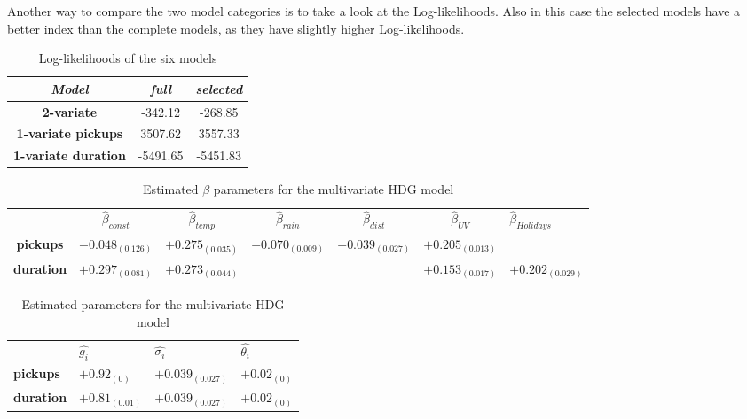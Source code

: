 Another way to compare the two model categories is to take a look at the Log-likelihoods. Also in this case the selected models have a better index than the complete models, as they have slightly higher Log-likelihoods.
\begin{table}[h!]
	\centering
	\begin{tabular}{c|c|c}
		\hline
		\textit{Model} &\textit{full } & \textit{selected} \\ 
		\hline
		\textbf{2-variate } & -342.12  & -268.85    \\ 
		\hline
		\textbf{1-variate pickups } & 3507.62  & 3557.33    \\ 
		\hline
		\textbf{1-variate duration} & -5491.65  & -5451.83   \\ 
		\hline
	\end{tabular}
	\caption{Log-likelihoods of the six models}
	\label{Log-likelihoods HDGM}
\end{table}

\begin{table}[h!]
	\centering
	\begin{tabular}{|ccccccl}
		\hline
		& $\hat{\beta}_{const}$  & $\hat{\beta}_{temp}$ & $\hat{\beta}_{rain}$ & $\hat{\beta}_{dist}$ & $\hat{\beta}_{UV}$ &$\hat{\beta}_{Holidays}$      \\ \cline{2-7} 
		\multicolumn{1}{|c|}{\textbf{pickups}}  & $-0.048_{(0.126)}$ & $+0.275_{(0.035)}$ & $-0.070_{(0.009)}$ & $+0.039_{(0.027)}$ & $+0.205_{(0.013)}$ &              \\
		\multicolumn{1}{|c|}{\textbf{duration}} & $+0.297_{(0.081)}$  & $+0.273_{(0.044)}$ &               &               & $+0.153_{(0.017)}$  & $+0.202_{(0.029)}$
	\end{tabular}
\caption{Estimated $\beta$ parameters for the multivariate HDG model}
\label{Bivariate Beta HDGM}
\end{table}

\begin{table}[]
	\begin{tabular}{|llll}
		\hline
		& $\hat{g_i}$  & $\hat{\sigma_i}$ & $\hat{\theta_i}$  \\ \cline{2-4} 
		\multicolumn{1}{|l|}{\textbf{pickups}}  &  $+0.92_{(0)}$ &  $+0.039_{(0.027)}$ & \multicolumn{1}{c}{$+0.02_{(0)}$ } \\
		\multicolumn{1}{|l|}{\textbf{duration}} &  $+0.81_{(0.01)}$ &  $+0.039_{(0.027)}$ &     $+0.02_{(0)}$                              
	\end{tabular}
	\caption{Estimated parameters for the multivariate HDG model}
\label{Bivariate Param_HDGM}
\end{table}

